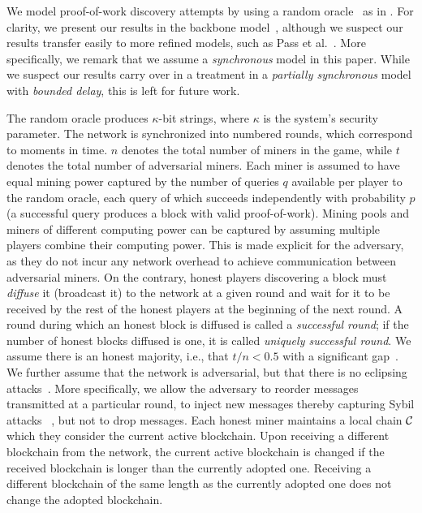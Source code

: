 We model proof-of-work discovery attempts by using a random oracle~\cite{RO} as
in \cite{backbone}. For clarity, we present our results in the backbone
model~\cite{backbone}, although we suspect our results transfer easily to more
refined models, such as Pass et al.~\cite{PSS}. More specifically, we remark
that we assume a \emph{synchronous} model in this paper. While we suspect our
results carry over in a treatment in a \emph{partially synchronous} model with
\emph{bounded delay}, this is left for future work.

The random oracle produces $\kappa$-bit strings, where $\kappa$ is the system's
security parameter. The network is synchronized into numbered rounds, which
correspond to moments in time. $n$ denotes the total number of miners in the
game, while $t$ denotes the total number of adversarial miners. Each miner is
assumed to have equal mining power captured by the number of queries $q$
available per player to the random oracle, each query of which succeeds
independently with probability $p$ (a successful query produces a block with
valid proof-of-work). Mining pools and miners of different computing power can
be captured by assuming multiple players combine their computing power. This is
made explicit for the adversary, as they do not incur any network overhead to
achieve communication between adversarial miners. On the contrary, honest
players discovering a block must \textit{diffuse} it (broadcast it) to the
network at a given round and wait for it to be received by the rest of the
honest players at the beginning of the next round. A round during which an
honest block is diffused is called a \textit{successful round}; if the number of
honest blocks diffused is one, it is called \textit{uniquely successful round}.
We assume there is an honest majority, i.e., that $t / n < 0.5$ with a
significant gap~\cite{backbone}. We further assume that the network is
adversarial, but that there is no eclipsing attacks~\cite{heilman2015eclipse}.
More specifically, we allow the adversary to reorder messages transmitted at a
particular round, to inject new messages thereby capturing Sybil attacks~
\cite{sybil}, but not to drop messages. Each honest miner maintains a local
chain $\mathcal{C}$ which they consider the current active blockchain. Upon receiving
a different blockchain from the network, the current active blockchain is
changed if the received blockchain is longer than the currently adopted one.
Receiving a different blockchain of the same length as the currently adopted one
does not change the adopted blockchain.

